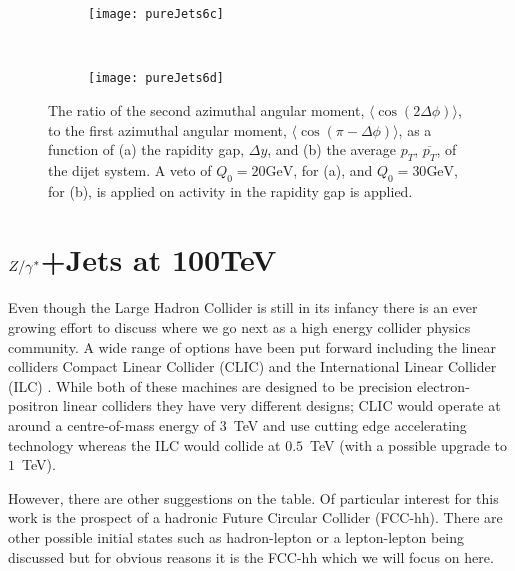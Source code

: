 	\begin{figure}[bth]
		\begin{subfigure}[b]{0.48\textwidth}
			\texttt{[image: pureJets6c]}
			\caption{}
			\label{fig:}
		\end{subfigure}
		~
		\begin{subfigure}[b]{0.48\textwidth}
			\texttt{[image: pureJets6d]}
			\caption{}
			\label{fig:}
		\end{subfigure}
		\caption{The ratio of the second azimuthal angular moment,
		$\langle \cos(2\Delta\phi)\rangle$, to the first azimuthal angular moment,
		$\langle \cos(\pi-\Delta\phi)\rangle$, as a function of (a) the rapidity gap,
		$\Delta y$, and (b) the average $p_T$, $\overline{p_T}$, of the dijet system.  A
		veto of $Q_0=20\text{GeV}$, for (a), and $Q_0=30\text{GeV}$, for (b), is applied
		on activity in the rapidity gap is applied.}
		\label{fig:atlasPJ6}
	\end{figure}

\chapter{$Z/\gamma^*$+Jets at 100TeV}
\label{chap:100TeV}

	Even though the Large Hadron Collider is still in its infancy there is an ever growing effort to discuss
	where we go next as a high energy collider physics community.  A wide range of options have been put forward
	including the linear colliders Compact Linear Collider (CLIC) \cite{Abramowicz:2013tzc} and the International
	Linear Collider (ILC) \cite{BrauJames:2007aa}.  While both of these machines are designed to be precision
	electron-positron linear colliders they have very different designs; CLIC would operate at around a
	centre-of-mass energy of $3$~TeV and use cutting edge accelerating technology whereas the ILC would collide
	at $0.5$~TeV (with a possible upgrade to $1$~TeV).

	However, there are other suggestions on the table.  Of particular interest for this work is the prospect
	of a hadronic Future Circular Collider (FCC-hh).  There are other possible initial states such as
	hadron-lepton or a lepton-lepton being discussed but for obvious reasons it is the FCC-hh which we will
	focus on here.

